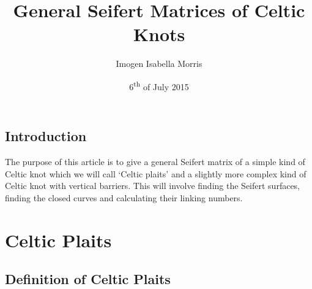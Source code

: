 \documentclass[10pt,a4paper]{report}
\author{Imogen Isabella Morris}
\title{General Seifert Matrices of Celtic Knots}
\date{6\textsuperscript{th} of July 2015}
\theoremstyle{definition}
\theoremstyle{remark}
\theoremstyle{example}
\begin{document}
\maketitle

\newpage

\tableofcontents

\section{Introduction}

The purpose of this article is to give a general Seifert matrix of a simple kind of Celtic knot which we will call `Celtic plaits' and a slightly more complex kind of Celtic knot with vertical barriers. This will involve finding the Seifert surfaces, finding the closed curves and calculating their linking numbers. 

\chapter{Celtic Plaits}

\section{Definition of Celtic Plaits} \label{sec:defplait}
\end{document}
